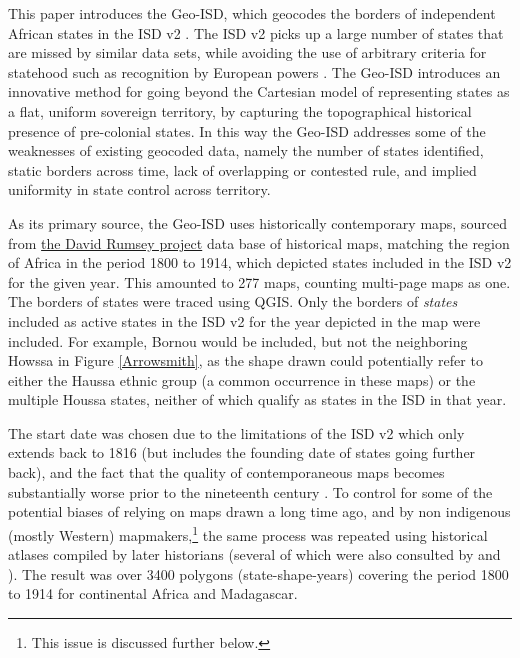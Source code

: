 \documentclass[12pt]{article}
\begin{document}
This paper introduces the Geo-ISD, which geocodes the borders of independent
African states in the ISD v2 \citep{Butcher2020}. The ISD v2 picks up a large
number of states that are missed by similar data sets, while avoiding the use of
arbitrary criteria for statehood such as recognition by European powers
\citep{Butcher2020}. The Geo-ISD introduces an innovative method for going
beyond the Cartesian model of representing states as a flat, uniform sovereign
territory, by capturing the topographical historical presence of pre-colonial
states. In this way the Geo-ISD addresses some of the weaknesses of existing
geocoded data, namely the number of states identified, static borders across
time, lack of overlapping or contested rule, and implied uniformity in state
control across territory.

As its primary source, the Geo-ISD uses historically contemporary maps, sourced
from \href{https://www.davidrumsey.com}{the David Rumsey project} data base of
historical maps, matching the region of Africa in the period 1800 to 1914, which
depicted states included in the ISD v2 for the given year. This amounted to 277
maps, counting multi-page maps as one. The borders of states were traced using
QGIS. Only the borders of \textit{states} included as active states in the ISD
v2 for the year depicted in the map were included. For example, Bornou would be
included, but not the neighboring Howssa in Figure \ref{Arrowsmith}, as the
shape drawn could potentially refer to either the Haussa ethnic group (a common
occurrence in these maps) or the multiple Houssa states, neither of which
qualify as states in the ISD in that year. 

The start date was chosen due to the limitations of the ISD v2 which only extends
back to 1816 (but includes the founding date of states going further back), and
the fact that the quality of contemporaneous maps becomes substantially worse
prior to the nineteenth century \citep{Bassett_1994}. To control for some of the
potential biases of relying on maps drawn a long time ago, and by non indigenous
(mostly Western) mapmakers,\footnote{This issue is discussed further below.} the
same process was repeated using historical atlases compiled by later historians
(several of which were also consulted by \citet{Depetris-Chauvin2016} and
\citet{Paine2019}). The result was over 3400 polygons (state-shape-years)
covering the period 1800 to 1914 for continental Africa and Madagascar. 

\end{document}
